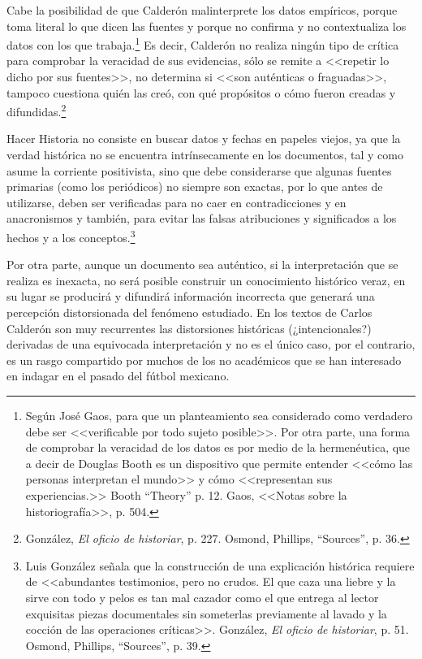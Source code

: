 \documentclass[11pt,a5paper,twoside]{book} %
\begin{document}
Cabe la posibilidad de que Calderón malinterprete los datos empíricos, porque toma
literal lo que dicen las fuentes y porque no confirma y no contextualiza los datos con los que
trabaja.\footnote{Según José Gaos, para que un planteamiento sea considerado como verdadero debe ser <<verificable por todo sujeto posible>>. Por otra parte, una forma de comprobar la veracidad de los datos es por medio de la hermenéutica, que a decir de Douglas Booth es un dispositivo que permite entender <<cómo las personas interpretan el mundo>> y cómo <<representan sus experiencias.>> Booth ``Theory'' p. 12. Gaos, <<Notas sobre la historiografía>>, p. 504.} Es decir, Calderón no realiza ningún tipo de crítica para comprobar la veracidad de sus evidencias, sólo se remite a <<repetir lo dicho por sus fuentes>>, no determina si <<son auténticas o fraguadas>>, tampoco cuestiona quién las creó, con qué propósitos o cómo fueron creadas y difundidas.\footnote{González, \emph{El oficio de historiar}, p. 227. Osmond, Phillips, ``Sources'', p. 36.}

Hacer Historia no consiste en buscar datos y fechas en papeles viejos, ya que la verdad
histórica no se encuentra intrínsecamente en los documentos, tal y como asume la corriente
positivista, sino que debe considerarse que algunas fuentes primarias (como los periódicos)
no siempre son exactas, por lo que antes de utilizarse, deben ser verificadas para no caer en contradicciones y en anacronismos y también, para evitar las falsas atribuciones y
significados a los hechos y a los conceptos.\footnote{Luis González señala que la construcción de una explicación histórica requiere de <<abundantes testimonios, pero no crudos. El que caza una liebre y la sirve con todo y pelos es tan mal cazador como el que entrega al lector exquisitas piezas documentales sin someterlas previamente al lavado y la cocción de las operaciones críticas>>. González, \emph{El oficio de historiar}, p. 51. Osmond, Phillips, ``Sources'', p. 39.}

Por otra parte, aunque un documento sea auténtico, si la interpretación que se realiza
es inexacta, no será posible construir un conocimiento histórico veraz, en su lugar se
producirá y difundirá información incorrecta que generará una percepción distorsionada del
fenómeno estudiado. En los textos de Carlos Calderón son muy recurrentes las distorsiones
históricas (¿intencionales?) derivadas de una equivocada interpretación y no es el único caso,
por el contrario, es un rasgo compartido por muchos de los no académicos que se han
interesado en indagar en el pasado del fútbol mexicano.
\end{document}
